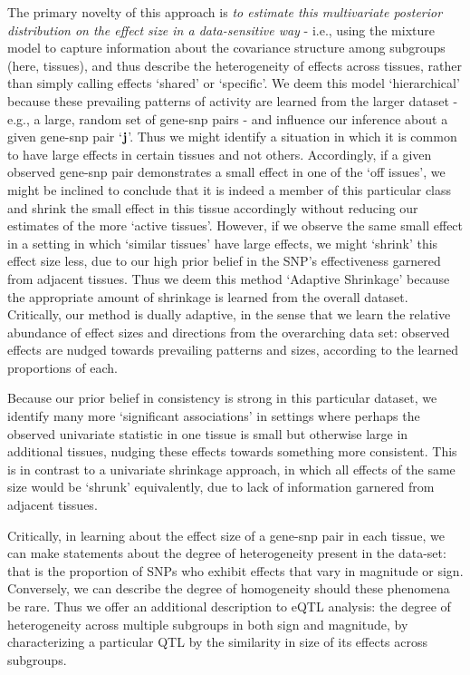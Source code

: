 The primary novelty of this approach is {\it to estimate this multivariate posterior distribution on the effect size in a data-sensitive way} - i.e., using the mixture model to capture information about the covariance structure among subgroups (here, tissues), and thus describe the heterogeneity of effects across tissues, rather than simply calling effects `shared' or `specific'. We deem this model `hierarchical' because these prevailing patterns of activity are learned from the larger dataset - e.g., a large, random set of gene-snp pairs - and influence our inference about a given gene-snp pair `$\bf{j}$'. Thus we might identify a situation in which it is common to have large effects in certain tissues and not others. Accordingly, if a given observed gene-snp pair demonstrates a small effect in one of the `off issues', we might be inclined to conclude that it is indeed a member of this particular class and shrink the small effect in this tissue accordingly without reducing our estimates of the more `active tissues'. However, if we observe the same small effect in a setting in which `similar tissues' have large effects, we might `shrink' this effect size less, due to our high prior belief in the SNP's effectiveness garnered from adjacent tissues. Thus we deem this method `Adaptive Shrinkage' because the appropriate amount of shrinkage is learned from the overall dataset. Critically, our method is dually adaptive, in the sense that we learn the relative abundance of effect sizes and directions from the overarching data set: observed effects are nudged towards prevailing patterns and sizes, according to the learned proportions of each.

Because our prior belief in consistency is strong in this particular dataset, we identify many more `significant associations'  in settings where perhaps the observed univariate statistic in one tissue is small but otherwise large in additional tissues, nudging these effects towards something more consistent. This is in contrast to a univariate shrinkage approach, in which all effects of the same size would be `shrunk' equivalently, due to lack of information garnered from adjacent tissues. 
%

Critically, in learning about the effect size of a gene-snp pair in each tissue, we can make statements about the degree of heterogeneity present in the data-set: that is the proportion of SNPs who exhibit effects that vary in magnitude or sign. Conversely, we can describe the degree of homogeneity should these phenomena be rare. Thus we offer an additional description to eQTL analysis: the degree of heterogeneity across multiple subgroups in both sign and magnitude, by characterizing a particular QTL by the similarity in size of its effects across subgroups. 